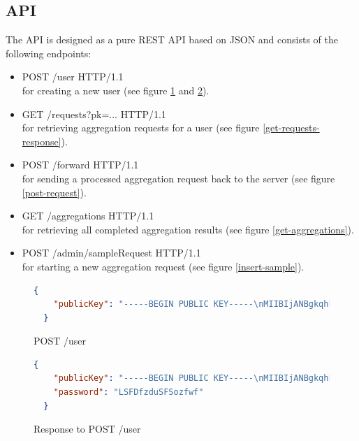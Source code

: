 \begin{samepage}
\section{API}\label{api}
The API is designed as a pure REST API based on JSON and consists of the following endpoints:
\begin{itemize}
	\item POST /user HTTP/1.1
  \\for creating a new user (see figure \ref{post-user-request} and \ref{post-user-response}).

	\item GET /requests?pk=... HTTP/1.1
  \\for retrieving aggregation requests for a user (see figure \ref{get-requests-response}).

	\item POST /forward HTTP/1.1
  \\for sending a processed aggregation request back to the server (see figure \ref{post-request}).

	\item GET /aggregations HTTP/1.1
  \\for retrieving all completed aggregation results (see figure \ref{get-aggregations}).

	\item POST /admin/sampleRequest HTTP/1.1
  \\for starting a new aggregation request (see figure \ref{insert-sample}).
\end{itemize}
\end{samepage}

\begin{figure}[!h]
  \begin{lstlisting}[language=json,firstnumber=1]
  {
    "publicKey": "-----BEGIN PUBLIC KEY-----\nMIIBIjANBgkqhkiG..."
  }
  \end{lstlisting}
  \caption{POST /user}
  \label{post-user-request}
\end{figure}

\begin{figure}[h!]
  \begin{lstlisting}[language=json,firstnumber=1]
  {
    "publicKey": "-----BEGIN PUBLIC KEY-----\nMIIBIjANBgkqhkiG...",
    "password": "LSFDfzduSFSozfwf"
  }
  \end{lstlisting}
  \caption{Response to POST /user}
  \label{post-user-response}
\end{figure}

